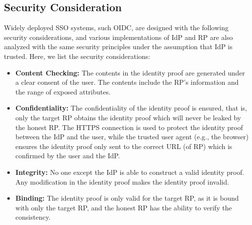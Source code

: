 \subsection{Security Consideration}
Widely deployed SSO systems, such OIDC, are designed with the following security considerations, and various implementations of IdP and RP are also analyzed with the same security principles under the assumption that IdP is trusted. Here, we list the security considerations:
\begin{itemize}
    \item \textbf{Content Checking: }The contents in the identity proof are generated under a clear consent of the user. The contents include the RP's information and the range of exposed attributes.
    \item \textbf{Confidentiality: }The confidentiality of the identity proof is ensured, that is, only the target RP obtains the identity proof which will never be leaked by the honest RP. The HTTPS connection is used to protect the identity proof between the IdP and the user, while the trusted user agent (e.g., the browser) ensures the identity proof only sent to the correct URL (of RP) which is confirmed by the user and the IdP.
    \item  \textbf{Integrity: }No one except the IdP is able to construct a valid identity proof.
Any modification in the identity proof makes the identity proof invalid.
    \item  \textbf{Binding: }The identity proof is only valid for the target RP, as it is bound with only the target RP, and the honest RP has the ability to verify the consistency. 
\end{itemize}



